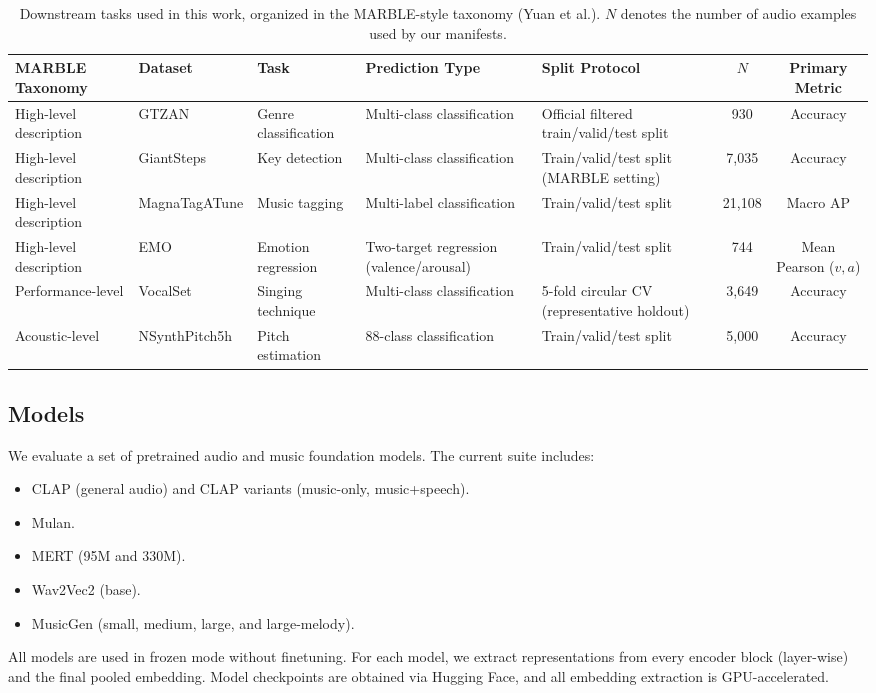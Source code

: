 \begin{table}[t]
\centering
\small
\begin{tabular}{lllp{2.3cm}p{2.6cm}cc}
\hline
\textbf{MARBLE Taxonomy} & \textbf{Dataset} & \textbf{Task} & \textbf{Prediction Type} & \textbf{Split Protocol} & \textbf{$N$} & \textbf{Primary Metric} \\
\hline
High-level description & GTZAN & Genre classification & Multi-class classification & Official filtered train/valid/test split & 930 & Accuracy \\
High-level description & GiantSteps & Key detection & Multi-class classification & Train/valid/test split (MARBLE setting) & 7,035 & Accuracy \\
High-level description & MagnaTagATune & Music tagging & Multi-label classification & Train/valid/test split & 21,108 & Macro AP \\
High-level description & EMO & Emotion regression & Two-target regression (valence/arousal) & Train/valid/test split & 744 & Mean Pearson ($v,a$) \\
Performance-level & VocalSet & Singing technique & Multi-class classification & 5-fold circular CV (representative holdout) & 3,649 & Accuracy \\
Acoustic-level & NSynthPitch5h & Pitch estimation & 88-class classification & Train/valid/test split & 5,000 & Accuracy \\
\hline
\end{tabular}
\caption{Downstream tasks used in this work, organized in the MARBLE-style taxonomy (Yuan et al.). $N$ denotes the number of audio examples used by our manifests.}
\label{tab:downstream_tasks}
\end{table}

\subsection{Models}
We evaluate a set of pretrained audio and music foundation models. The current suite includes:
\begin{itemize}
  \item CLAP (general audio) and CLAP variants (music-only, music+speech).
  \item Mulan.
  \item MERT (95M and 330M).
  \item Wav2Vec2 (base).
  \item MusicGen (small, medium, large, and large-melody).
\end{itemize}
All models are used in frozen mode without finetuning. For each model, we extract representations from every encoder block (layer-wise) and the final pooled embedding. Model checkpoints are obtained via Hugging Face, and all embedding extraction is GPU-accelerated.


